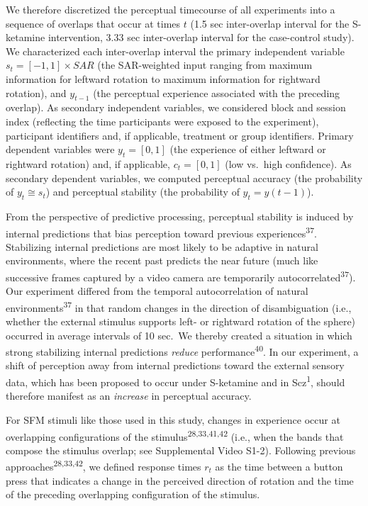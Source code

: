 \documentclass[
]{article}
\begin{document}
We therefore discretized the perceptual timecourse of all experiments
into a sequence of overlaps that occur at times \(t\) (1.5 sec
inter-overlap interval for the S-ketamine intervention, 3.33 sec
inter-overlap interval for the case-control study). We characterized
each inter-overlap interval the primary independent variable
\(s_t = [-1, 1] \times SAR\) (the SAR-weighted input ranging from
maximum information for leftward rotation to maximum information for
rightward rotation), and \(y_{t-1}\) (the perceptual experience
associated with the preceding overlap). As secondary independent
variables, we considered block and session index (reflecting the time
participants were exposed to the experiment), participant identifiers
and, if applicable, treatment or group identifiers. Primary dependent
variables were \(y_t = [0,1]\) (the experience of either leftward or
rightward rotation) and, if applicable, \(c_t = [0,1]\) (low vs.~high
confidence). As secondary dependent variables, we computed perceptual
accuracy (the probability of \(y_t \cong s_t\)) and perceptual stability
(the probability of \(y_t = y(t - 1)\)).

From the perspective of predictive processing, perceptual stability is
induced by internal predictions that bias perception toward previous
experiences\textsuperscript{37}. Stabilizing internal predictions are
most likely to be adaptive in natural environments, where the recent
past predicts the near future (much like successive frames captured by a
video camera are temporarily autocorrelated\textsuperscript{37}). Our
experiment differed from the temporal autocorrelation of natural
environments\textsuperscript{37} in that random changes in the direction
of disambiguation (i.e., whether the external stimulus supports left- or
rightward rotation of the sphere) occurred in average intervals of 10
sec.~We thereby created a situation in which strong stabilizing internal
predictions \emph{reduce} performance\textsuperscript{40}. In our
experiment, a shift of perception away from internal predictions toward
the external sensory data, which has been proposed to occur under
S-ketamine and in Scz\textsuperscript{1}, should therefore manifest as
an \emph{increase} in perceptual accuracy.

For SFM stimuli like those used in this study, changes in experience
occur at overlapping configurations of the
stimulus\textsuperscript{28,33,41,42} (i.e., when the bands that compose
the stimulus overlap; see Supplemental Video S1-2). Following previous
approaches\textsuperscript{28,33,42}, we defined response times \(r_t\)
as the time between a button press that indicates a change in the
perceived direction of rotation and the time of the preceding
overlapping configuration of the stimulus.
\end{document}
